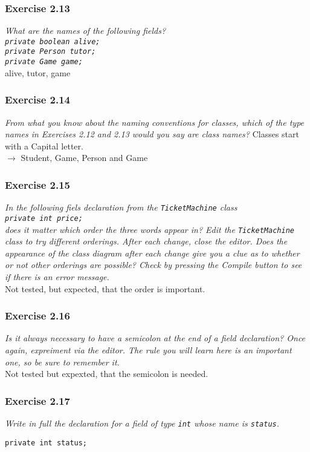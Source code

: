 \subsubsection*{Exercise 2.13}
\textit{What are the names of the following fields? \\
\lstinline{private boolean alive;}\\
\lstinline{private Person tutor;}\\
\lstinline{private Game game;}}\\
alive, tutor, game

\subsubsection*{Exercise 2.14}
\textit{From what you know about the naming conventions for classes, which of 
the type names in Exercises 2.12 and 2.13 would you say are class names? }
Classes start with a Capital letter. \\
$\rightarrow$ Student, Game, Person and Game

\subsubsection*{Exercise 2.15}
\textit{In the following fiels declaration from the \lstinline{TicketMachine} class\\
\lstinline{private int price;}\\
does it matter which order the three words appear in? Edit the 
\lstinline{TicketMachine} class to try different orderings. After each change, 
close the editor. Does the appearance of the class diagram after each change 
give you a clue as to whether or not other orderings are possible? Check by 
pressing the Compile button to see if there is an error message. }\\
Not tested, but expected, that the order is important. 

\subsubsection*{Exercise 2.16}
\textit{Is it always necessary to have a semicolon at the end of a field 
declaration? Once again, expreiment via the editor. The rule you will learn 
here is an important one, so be sure to remember it. }\\
Not tested but expexted, that the semicolon is needed. 

\subsubsection*{Exercise 2.17}
\textit{Write in full the declaration for a field of type \lstinline{int} whose 
name is \lstinline{status}. }\\
\begin{lstlisting}[caption=Solution for Exercise 2.17]
private int status;
\end{lstlisting}

